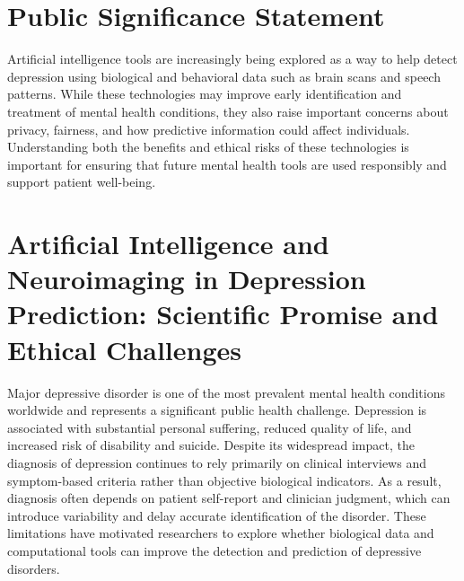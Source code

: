 \documentclass[12pt]{article}
\begin{document}
\newpage
\section*{Public Significance Statement}    

\noindent Artificial intelligence tools are increasingly being explored as a way to help detect depression using biological and behavioral data such as brain scans and speech patterns. While these technologies may improve early identification and treatment of mental health conditions, they also raise important concerns about privacy, fairness, and how predictive information could affect individuals. Understanding both the benefits and ethical risks of these technologies is important for ensuring that future mental health tools are used responsibly and support patient well-being.

\newpage
\section{Artificial Intelligence and Neuroimaging in Depression Prediction: Scientific Promise and Ethical Challenges}


Major depressive disorder is one of the most prevalent mental health conditions worldwide and represents a significant public health challenge. Depression is associated with substantial personal suffering, reduced quality of life, and increased risk of disability and suicide. Despite its widespread impact, the diagnosis of depression continues to rely primarily on clinical interviews and symptom-based criteria rather than objective biological indicators. As a result, diagnosis often depends on patient self-report and clinician judgment, which can introduce variability and delay accurate identification of the disorder. These limitations have motivated researchers to explore whether biological data and computational tools can improve the detection and prediction of depressive disorders.
\end{document}
